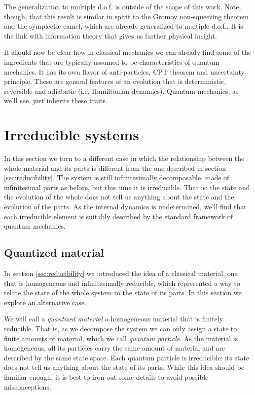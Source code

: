 \documentclass[aps,pra,10pt,twocolumn,floatfix,nofootinbib]{revtex4-1}
\numberwithin{equation}{section}
\theoremstyle{definition}
\begin{document}
The generalization to multiple d.o.f. is outside of the scope of this work. Note, though, that this result is similar in spirit to the Gromov non-squeezing theorem and the symplectic camel, which are already generalized to multiple d.o.f.. It is the link with information theory that gives us further physical insight.

It should now be clear how in classical mechanics we can already find some of the ingredients that are typically assumed to be characteristics of quantum mechanics. It has its own flavor of anti-particles, CPT theorem and uncertainty principle. These are general features of an evolution that is deterministic, reversible and adiabatic (i.e. Hamiltonian dynamics). Quantum mechanics, as we'll see, just inherits these traits.

\section{Irreducible systems}

In this section we turn to a different case in which the relationship between the whole material and its parts is different from the one described in section \ref{sec:reducibility}. The system is still infinitesimally decomposable, made of infinitesimal parts as before, but this time it is irreducible. That is: the state and the evolution of the whole does not tell us anything about the state and the evolution of the parts. As the internal dynamics is undetermined, we'll find that each irreducible element is suitably described by the standard framework of quantum mechanics.

\subsection{Quantized material}

In section \ref{sec:reducibility} we introduced the idea of a classical material, one that is homogeneous and infinitesimally reducible, which represented a way to relate the state of the whole system to the state of its parts. In this section we explore an alternative case.

We will call a \emph{quantized material} a homogeneous material that is finitely reducible. That is, as we decompose the system we can only assign a state to finite amounts of material, which we call \emph{quantum particle}. As the material is homogeneous, all its particles carry the same amount of material and are described by the same state space. Each quantum particle is irreducible: its state does not tell us anything about the state of its parts. While this idea should be familiar enough, it is best to iron out some details to avoid possible misconceptions.
\end{document}
